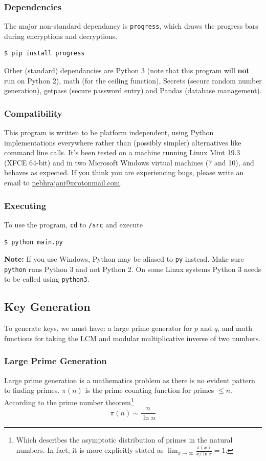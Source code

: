 \documentclass[titlepage]{article}
\begin{document}
\subsubsection{Dependencies}
The major non-standard dependancy is \texttt{progress}, which draws the progress bars during
encryptions and decryptions.
\begin{verbatim}
$ pip install progress
\end{verbatim}

Other (standard) dependancies are Python 3 (note that this program will \textbf{not} run on Python 2), math
(for the ceiling function), Secrets (secure random number generation), getpass (secure password
entry) and Pandas (database management).

\subsubsection{Compatibility}
This program is written to be platform independent, using Python implementations everywhere rather
than (possibly simpler) alternatives like command line calls. It's been tested on a machine running
Linux Mint 19.3 (XFCE 64-bit) and in two Microsoft Windows virtual machines (7 and 10), and behaves
as expected. If you think you are experiencing bugs, please write an email to \href{mailto:
nebhrajani@protonmail.com}{nebhrajani@protonmail.com}.


\subsubsection{Executing}
To use the program, \texttt{cd} to \texttt{/src} and execute
\begin{verbatim}
$ python main.py
\end{verbatim}


\textbf{Note:} If you use Windows, Python may be aliased to \texttt{py} instead. Make sure \texttt{python} runs Python 3 and not Python 2. On some Linux systems
Python 3 needs to be called using \texttt{python3}.


\subsection{Key Generation}
To generate keys, we must have: a large prime generator for $p$ and $q$, and math functions for
taking the LCM and modular multiplicative inverse of two numbers.

\subsubsection{Large Prime Generation}
Large prime generation is a mathematics problem as there is no evident pattern to finding primes.
$\pi(n)$ is the prime counting function for primes $\leq n$. According to the prime number
theorem\footnote{Which describes the asymptotic distribution of primes in the natural numbers. In fact, it is more explicitly stated as $\lim_{x\to\infty} \frac{\pi(x)}{x/ \ln{x}} = 1$.}
$$\pi(n) \sim \frac{n}{\ln{n}}$$
\end{document}
